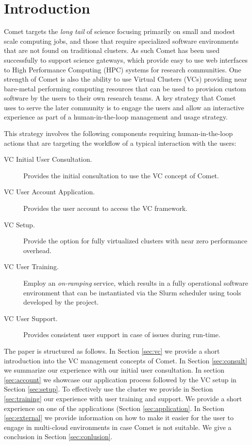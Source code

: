 \documentclass[sigconf,hyphens]{acmart}
\begin{document}
\section{Introduction}\label{sec:intro}

Comet targets the \textit{long tail} of science
\cite{comet17tails}\cite{comet-vc} focusing primarily on small and
modest scale computing jobs, and those that require specialized
software environments that are not found on traditional clusters. As
such Comet has been used successfully to support science gateways,
which provide easy to use web interfaces to High Performance Computing
(HPC) systems for research communities. One strength of Comet is also
the ability to use Virtual Clusters (VCs) providing near bare-metal
performing computing resources that can be used to provision custom
software by the users to their own research teams. A key strategy that
Comet uses to serve the later community is to engage the users and
allow an interactive experience as part of a human-in-the-loop
management and usage strategy.

This strategy involves the following components requiring
human-in-the-loop actions that are targeting the workflow of a typical
interaction with the users:

\begin{description}

\item[VC Initial User Consultation.] Provides the initial consultation
  to use the VC concept of Comet.

\item[VC User Account Application.] Provides the user account to
  access the VC framework.

\item[VC Setup.] Provide the option for fully virtualized clusters
      with near zero performance overhead.

\item[VC User Training.] Employ an \textit{on-ramping} service,
which results in a fully operational software environment that
can be instantiated via the Slurm scheduler using tools
developed by the project.

\item[VC User Support.] Provides consistent user support in case
  of issues during run-time.

\end{description}

The paper is structured as follows. In Section \ref{sec:vc} we provide
a short introduction into the VC management concepts of Comet. In
Section \ref{sec:consult} we summarize our experience with our initial
user consultation. In section \ref{sec:account} we showcase our
application process followed by the VC setup in Section
\ref{sec:setup}. To effectively use the cluster we provide in Section
\ref{sec:training} our experience with user training and support. We
provide a short experience on one of the applications (Section
\ref{sec:application}. In Section \ref{sec:external} we provide
information on how to make it easier for the user to engage in
multi-cloud environments in case Comet is not suitable. We give a
conclusion in Section \ref{sec:conlusion}.
\end{document}
